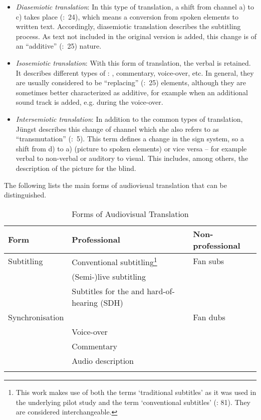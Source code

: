\begin{itemize}
\item \textit{Diasemiotic translation}: In this type of translation, a shift from channel a) to c) takes place (\citealt{Leisner2009}:~24), which means a conversion from spoken elements to written text. Accordingly, diasemiotic translation describes the subtitling process. As text not included in the original version is added, this change is of an “additive” (\citealt{Leisner2009}:~25) nature.
\item \textit{Isosemiotic translation}: With this form of translation, the verbal  is retained. It describes different types of : , commentary, voice-over, etc. In general, they are usually considered to be “replacing” (\citealt{Leisner2009}:~25) elements, although they are sometimes better characterized as additive, for example when an additional sound track is added, e.g. during the voice-over.
\item \textit{Intersemiotic translation}: In addition to the common types of translation, Jüngst describes this change of channel which she also refers to as “transmutation” (\citeyear{Jungst2010}:~5). This term defines a change in the sign system, so a shift from d) to a) (picture to spoken elements) or vice versa – for example verbal to non-verbal or auditory to visual. This includes, among others, the description of the picture for the blind.
\end{itemize}

The following  lists the main forms of audiovisual translation that can be distinguished.

\begin{table}[b]
\begin{tabularx}{\textwidth}{lQl}
\lsptoprule
 Form &  Professional &  Non-professional\\
 \midrule 
 Subtitling & Conventional subtitling\footnote{This work makes use of both the terms ‘traditional subtitles’ as it was used in the underlying pilot study and the term ‘conventional subtitles’ (\citealt{Foerster2010}: 81). They are considered interchangeable.} & Fan subs\\
& (Semi-)live subtitling & \\
& Subtitles for the  and hard-of-hearing (SDH) & \\
\tablevspace
 Synchronisation &  & Fan dubs\\
& Voice-over & \\
& Commentary & \\
& Audio description & \\
\lspbottomrule
\end{tabularx} 
\caption{Forms of Audiovisual Translation}
\label{tab:TAB1}
\end{table}

